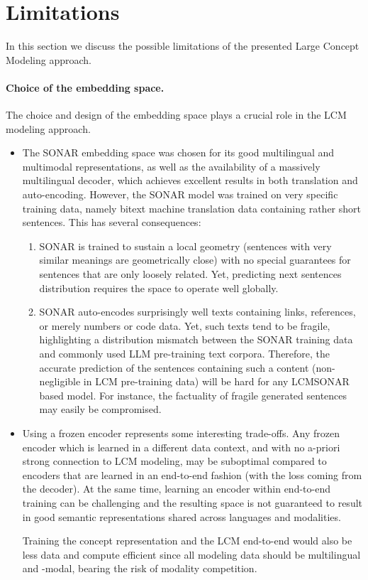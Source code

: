 \documentclass[twoside,11pt]{fairmeta}
\newcommand{\llm}{\textsc{LLM}\xspace}
\newcommand{\sonar}{\textsc{SONAR}\xspace}
\newcommand{\lcm}{\textsc{LCM}\xspace}
\begin{document}
    
    
    

\section{Limitations}
\label{sec:limits}

In this section we discuss the possible limitations of the presented Large Concept Modeling approach.

\paragraph{Choice of the embedding space.}
 The choice and design of the embedding space plays a crucial role in the \lcm modeling approach. 

\begin{itemize}
    \item The \sonar embedding space was chosen for its good multilingual and multimodal representations, as well as the availability of a massively multilingual decoder, which achieves excellent results in both translation and auto-encoding. However, the \sonar model was trained on very specific training data, namely bitext machine translation data containing rather short sentences. This has several consequences:
    \begin{enumerate}
        \item \sonar is trained to sustain a local geometry (sentences with very similar meanings are geometrically close) with no special guarantees for sentences that are only loosely related.
        Yet, predicting next sentences distribution requires the space to operate well globally. 
        \item \sonar auto-encodes surprisingly well texts containing links, references, or merely numbers or code data.
        Yet, such texts tend to be fragile, highlighting a distribution mismatch between the \sonar training data and commonly used \llm pre-training text corpora.
        Therefore, the accurate prediction of the sentences containing such a content (non-negligible in \lcm pre-training data) will be hard for any \lcm \sonar based model. For instance, the factuality of fragile generated sentences may easily be compromised. 
    \end{enumerate}

\item   Using a frozen encoder represents some interesting trade-offs. 
Any frozen encoder which is learned in a different data context, and with no a-priori strong connection to \lcm modeling, may be suboptimal compared to encoders that are learned in an end-to-end fashion (with the loss coming from the decoder). 
 At the same time, learning an encoder within end-to-end training can be challenging and the resulting space is not guaranteed to result in good semantic representations shared across languages and modalities.

 Training the concept representation and the \lcm end-to-end would also be less data and compute efficient since all modeling data should be multilingual and -modal, bearing the risk of modality competition.
\end{itemize}
\end{document}
